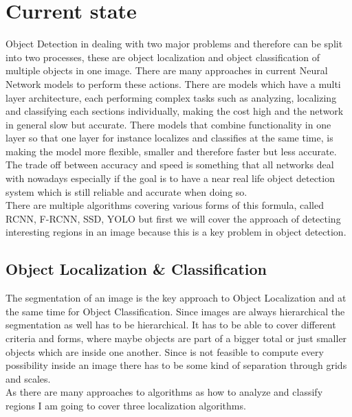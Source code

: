 \section{Current state}
Object Detection in dealing with two major problems and therefore can be split into two processes, these are object localization and object
classification of multiple objects in one image. There are many approaches in current Neural Network models to perform these actions.
There are models which have a multi layer architecture, each performing complex tasks such as analyzing, localizing and classifying each
sections individually, making the cost high and the network in general slow but accurate.
There models that combine functionality in one layer so that one layer for instance localizes and classifies at the same time, is making the
model more flexible, smaller and therefore faster but less accurate.
The trade off between accuracy and speed is something that all networks deal with nowadays especially if the goal is to have a near real life object
detection system which is still reliable and accurate when doing so. \\
There are multiple algorithms covering various forms of this formula, called RCNN, F-RCNN, SSD, YOLO but first we will cover the approach of
detecting interesting regions in an image because this is a key problem in object detection.

\subsection{Object Localization \& Classification}
The segmentation of an image is the key approach to Object Localization and at the same time for Object Classification. Since images are always hierarchical the segmentation as well has
to be hierarchical. It has to be able to cover different criteria and forms, where maybe objects are part of a bigger total or just  smaller
objects which are inside one another. Since is not feasible to compute every possibility inside an image there has to be some kind of
separation through grids and scales. \\
As there are many approaches to algorithms as how to analyze and classify regions I am going to cover three localization algorithms.

